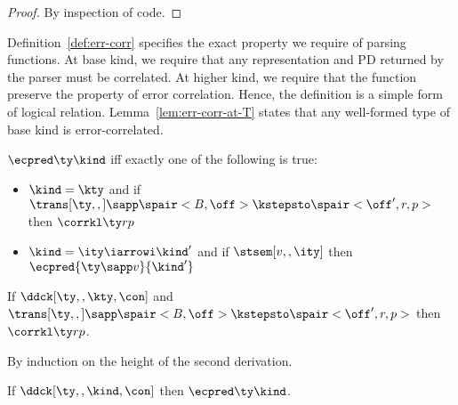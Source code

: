 {\begin{proof}
  By inspection of code. 
\end{proof}
}

Definition~\ref{def:err-corr} specifies the exact property we require
of parsing functions. At base kind, we require that any representation and PD
returned by the parser must be correlated. At higher kind, we require
that the function preserve the property of error correlation. Hence,
the definition is a simple form of logical relation.
Lemma~\ref{lem:err-corr-at-T} states that any well-formed type of base
kind is error-correlated.

\begin{definition}
\label{def:err-corr}
$\ecpred \ty \kind$ iff exactly one of the following is true:
  \begin{itemize}
  \item $\kind = \kty$ and if $\trans[\ty,,] \sapp \spair<B,\off> \kstepsto
  \spair<\off',r,p>$ then $\corrkl \ty r p$
  \item $\kind = \ity \iarrowi \kind'$ and if $\stsem[v,,\ity]$
    then $\ecpred {\ty \sapp v} {\kind'}$
  \end{itemize}
\end{definition}

\begin{lemma}
\label{lem:err-corr-at-T}
If $\ddck[\ty,,\kty,\con]$ and $\trans[\ty,,] \sapp \spair<B,\off> \kstepsto
  \spair<\off',r,p>$ then $\corrkl \ty r p$.
\end{lemma}

\begin{proofsketch}
  By induction on the height of the second derivation.
\end{proofsketch}

\begin{theorem}
\label{thm:err-corr}
If $\ddck[\ty,,\kind,\con]$ then $\ecpred \ty \kind$.
\end{theorem}

